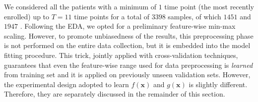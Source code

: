We considered all the patients with a minimum of $1$ time point (the most recently enrolled) up to $T=11$ time points for a total of $3398$ samples, of which $1451$ \RR and $1947$ \SP.
Following the EDA, we opted for a preliminary feature-wise min-max scaling.
However, to promote unbiasedness of the results, this preprocessing phase is not performed on the entire data collection, but it is embedded into the model fitting procedure. This trick, jointly applied with cross-validation techniques, guarantees that even the feature-wise range used for data preprocessing is \textit{learned} from training set and it is applied on previously unseen validation sets.
However, the experimental design adopted to learn $f(\bm{x})$ and $g(\bm{x})$ is slightly different. Therefore, they are separately discussed in the remainder of this section.


